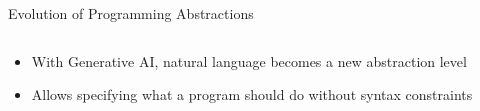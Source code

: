 \documentclass[xcolor=dvipsnames, aspectratio=169]{beamer}
\begin{document}
\begin{frame}{Evolution of Programming Abstractions}
\begin{columns}
\begin{column}{0.4\textwidth}
    \end{column}
  \end{columns}
  
  \vspace{3em}

  \begin{alertbox}
    \begin{itemize}
      \item With Generative AI, natural language becomes a new abstraction level
      \item Allows specifying what a program should do without syntax constraints
    \end{itemize}
  \end{alertbox}
\end{frame}
\end{document}
